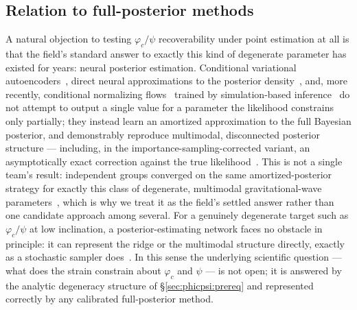 \subsection{Relation to full-posterior methods}
\label{sec:phicpsi:npe}

A natural objection to testing $\varphi_c/\psi$ recoverability under point estimation at all is that the field's standard answer to exactly this kind of degenerate parameter has existed for years: neural posterior estimation.
Conditional variational autoencoders~\citep{gabbard2022vitamin}, direct neural approximations to the posterior density~\citep{chua2020learning,green2020complete}, and, more recently, conditional normalizing flows~\citep{papamakarios2021normalizing} trained by simulation-based inference~\citep{cranmer2020frontier,dax2021dingo,dax2023dingois} do not attempt to output a single value for a parameter the likelihood constrains only partially; they instead learn an amortized approximation to the full Bayesian posterior, and demonstrably reproduce multimodal, disconnected posterior structure --- including, in the importance-sampling-corrected variant, an asymptotically exact correction against the true likelihood~\citep{dax2023dingois}.
This is not a single team's result: independent groups converged on the same amortized-posterior strategy for exactly this class of degenerate, multimodal gravitational-wave parameters~\citep{chua2020learning,green2020complete,gabbard2022vitamin,dax2021dingo}, which is why we treat it as the field's settled answer rather than one candidate approach among several.
For a genuinely degenerate target such as $\varphi_c/\psi$ at low inclination, a posterior-estimating network faces no obstacle in principle: it can represent the ridge or the multimodal structure directly, exactly as a stochastic sampler does~\citep{veitch2015lalinference,ashton2019bilby}.
In this sense the underlying scientific question --- what does the strain constrain about $\varphi_c$ and $\psi$ --- is not open; it is answered by the analytic degeneracy structure of \S\ref{sec:phicpsi:prereq} and represented correctly by any calibrated full-posterior method.

